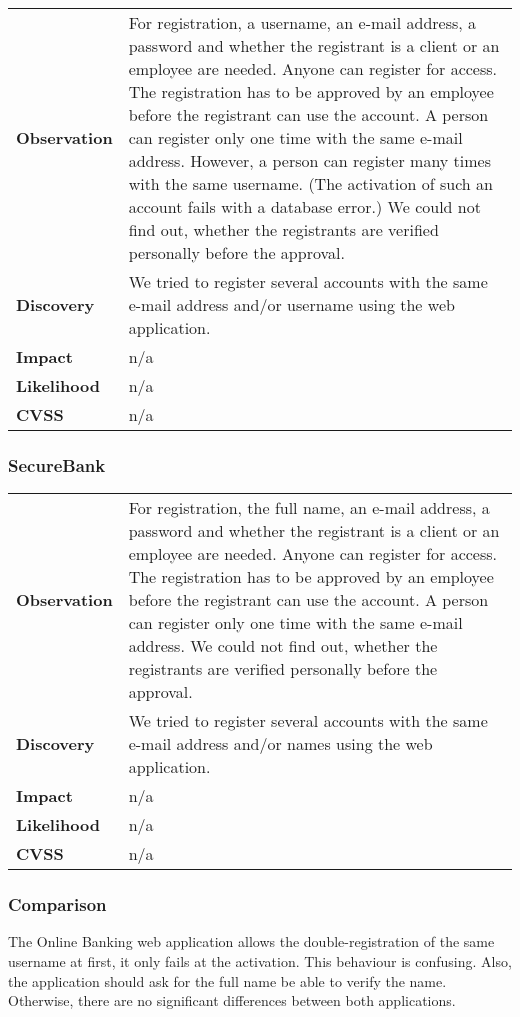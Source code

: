 \begin{tabular}{l|p{10cm}}

\textbf{Observation} & For registration, a username, an e-mail address, a password and whether the registrant is a client or an employee are needed. Anyone can register for access. The registration has to be approved by an employee before the registrant can use the account. A person can register only one time with the same e-mail address. However, a person can register many times with the same username. (The activation of such an account fails with a database error.) We could not find out, whether the registrants are verified personally before the approval. \\
\textbf{Discovery} & We tried to register several accounts with the same e-mail address and/or username using the web application. \\
\textbf{Impact} & n/a \\
\textbf{Likelihood} & n/a \\
\textbf{CVSS} & n/a \\
\end{tabular}

\subsubsection*{SecureBank}

\begin{tabular}{l|p{10cm}}

\textbf{Observation} & For registration, the full name, an e-mail address, a password and whether the registrant is a client or an employee are needed. Anyone can register for access. The registration has to be approved by an employee before the registrant can use the account. A person can register only one time with the same e-mail address. We could not find out, whether the registrants are verified personally before the approval. \\
\textbf{Discovery} & We tried to register several accounts with the same e-mail address and/or names using the web application. \\
\textbf{Impact} & n/a \\
\textbf{Likelihood} & n/a \\
\textbf{CVSS} & n/a \\
\end{tabular}

\subsubsection*{Comparison}
The Online Banking web application allows the double-registration of the same username at first, it only fails at the activation. This behaviour is confusing. Also, the application should ask for the full name be able to verify the name. Otherwise, there are no significant differences between both applications.

